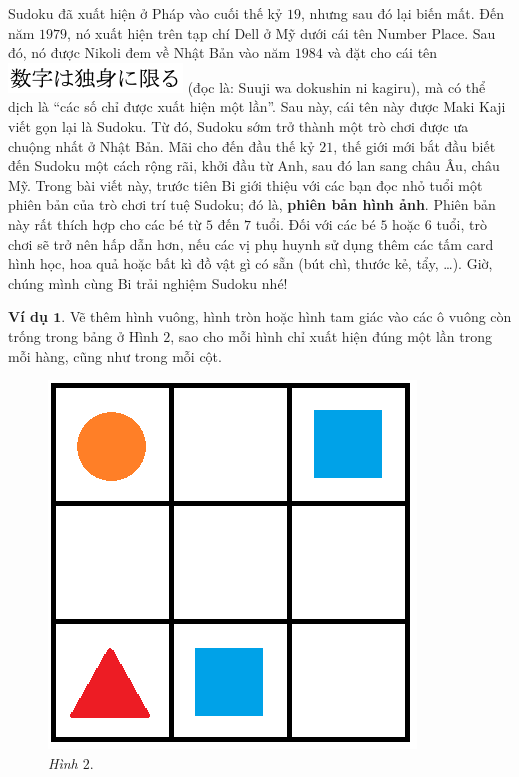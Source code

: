 	Sudoku đã xuất hiện ở Pháp vào cuối thế kỷ $19$, nhưng sau đó lại biến mất. Đến năm $1979$, nó xuất hiện trên tạp chí Dell ở Mỹ dưới cái tên Number Place. Sau đó, nó được Nikoli đem về Nhật Bản vào năm $1984$ và đặt cho cái tên  \includegraphics[scale=0.4]{sudoku} (đọc là: Suuji wa dokushin ni kagiru), mà có thể dịch là “các số chỉ được xuất hiện một lần”. Sau này, cái tên này được Maki Kaji viết gọn lại là Sudoku. Từ đó, Sudoku sớm trở thành một trò chơi được ưa chuộng nhất ở Nhật Bản. Mãi cho đến đầu thế kỷ $21$, thế giới mới bắt đầu biết đến Sudoku một cách rộng rãi, khởi đầu từ Anh, sau đó lan sang châu Âu, châu Mỹ.
	\vskip 0.1cm
	Trong bài viết này, trước tiên Bi giới thiệu với các bạn đọc nhỏ tuổi một phiên bản của trò chơi trí tuệ Sudoku; đó là, \textbf{phiên bản hình ảnh}. Phiên bản này rất thích hợp cho các bé từ $5$ đến $7$ tuổi.
	\vskip 0.1cm
	Đối với các bé $5$ hoặc $6$ tuổi, trò chơi sẽ trở nên hấp dẫn hơn, nếu các vị phụ huynh sử dụng thêm các tấm card hình học, hoa quả hoặc bất kì đồ vật gì có sẵn (bút chì, thước kẻ, tẩy, \ldots).
	\vskip 0.15cm
	Giờ, chúng mình cùng Bi trải nghiệm  Sudoku nhé!
	\begin{multicols}{2}
		\textbf{Ví dụ $\pmb 1.$} Vẽ thêm hình vuông, hình tròn hoặc hình tam giác vào các ô vuông còn trống trong bảng ở Hình $2$, sao cho mỗi hình chỉ xuất hiện đúng một lần trong mỗi hàng, cũng như trong mỗi cột.
		\begin{figure}[H]
			\vspace*{5pt}
			\centering
			\captionsetup{labelformat=empty, justification=centering}
			\includegraphics[scale=0.3]{hinh2}
			\caption{\textit{\small Hình $2.$}}
			\vspace*{-10pt}
		\end{figure}
	\end{multicols}
